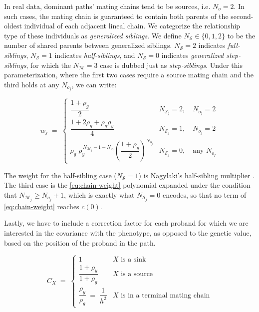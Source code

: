 \documentclass[12pt]{article}
\renewcommand{\Mu}{\mathcal{M}}
\begin{document}
In real data, dominant paths' mating chains tend to be sources, i.e. $N_o=2$.
In such cases, the mating chain is guaranteed to contain both parents of the second-oldest individual of each adjacent lineal chain.
We categorize the relationship type of these individuals as \emph{generalized siblings}.
We define $N_\mathcal{S} \in \{0,1,2\}$ to be the number of shared parents between generalized siblings.
$N_\mathcal{S} = 2$ indicates \emph{full-siblings},
$N_\mathcal{S} = 1$ indicates \emph{half-siblings}, and 
$N_\mathcal{S} = 0$ indicates \emph{generalized step-siblings},
for which the $N_\Mu = 3$ case is dubbed just as \emph{step-siblings}.
Under this parameterization, where the first two cases require a source mating chain and the third holds at any $N_{o_j}$, we can write:

\begin{equation}\label{eq:chain-weight-cases}
    w_j \;=\;
    \begin{cases}
        \dfrac{1+\rho_g}{2}
            & N_{\mathcal{S}_j} = 2, \quad N_{o_j} = 2 \\[14pt]
        \dfrac{1 + 2\rho_g + \rho_g\rho_y}{4}
            & N_{\mathcal{S}_j} = 1, \quad N_{o_j} = 2 \\[14pt]
        \rho_g\; \rho_y^{\,N_{\Mu_j} - 1 - N_{o_j}}
        \left( \dfrac{1+\rho_y}{2} \right)^{\!N_{o_j}}
            & N_{\mathcal{S}_j} = 0, \quad \text{any } N_{o_j}
    \end{cases}
\end{equation}

The weight for the half-sibling case ($N_\mathcal{S} = 1$) is Nagylaki's half-sibling multiplier \citep{Nagylaki1978}.
The third case is the \eqref{eq:chain-weight} polynomial expanded under the condition that $N_{\Mu_j} \geq N_{o_j} + 1$, which is exactly what $N_{\mathcal{S}_j} = 0$ encodes, so that no term of \eqref{eq:chain-weight} reaches $c(0)$.

Lastly, we have to include a correction factor for each proband for which we are interested in the covariance with the phenotype, as opposed to the genetic value, based on the position of the proband in the path.

\begin{equation}\label{eq:proband-correction}
    \boxed{\ C_X \;=\;
    \begin{cases}
        1
            & \text{$X$ is a sink} \\[10pt]
        \dfrac{1+\rho_y}{1+\rho_g}
            & \text{$X$ is a source} \\[10pt]
        \dfrac{\rho_y}{\rho_g} \;=\; \dfrac{1}{h^2}
            & \text{$X$ is in a terminal mating chain}
    \end{cases} \ }
\end{equation}
\end{document}
